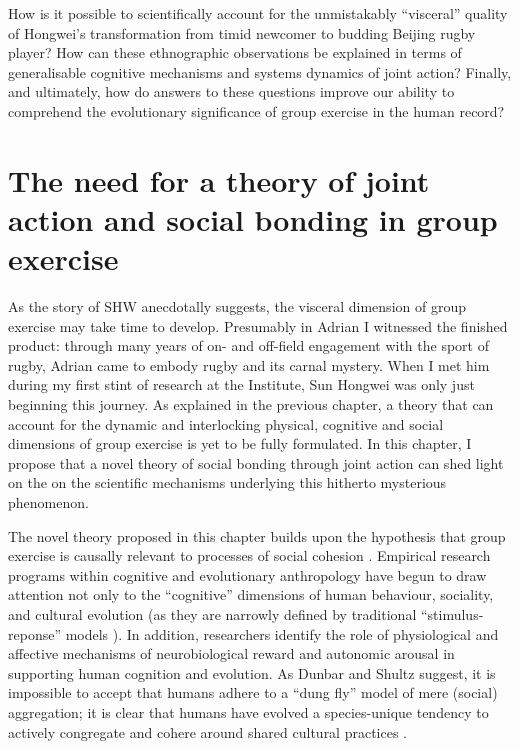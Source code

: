 \begin{CJK}{UTF8}{gbsn}
How is it possible to scientifically account for the unmistakably ``visceral'' quality of Hongwei's transformation from timid newcomer to budding Beijing rugby player?  How can these ethnographic observations be explained in terms of generalisable cognitive mechanisms and systems dynamics of joint action?  Finally, and ultimately, how do answers to these questions improve our ability to comprehend the evolutionary significance of group exercise in the human record?



\section{The need for a theory of joint action and social bonding in group exercise}
As the story of SHW anecdotally suggests, the visceral dimension of group exercise may take time to develop.  Presumably in  Adrian I witnessed the finished product: through many years of on- and off-field engagement with the sport of rugby, Adrian came to embody rugby and its carnal mystery.  When I met him during my first stint of research at the Institute, Sun Hongwei was only just beginning this journey. As explained in the previous chapter, a theory that can account for the dynamic and interlocking physical, cognitive and social dimensions of group exercise is yet to be fully formulated.  In this chapter, I propose that a novel theory of social bonding through joint action can shed light on the on the scientific mechanisms underlying this hitherto mysterious phenomenon.

The novel theory proposed in this chapter builds upon the hypothesis that group exercise is causally relevant to processes of social cohesion \citep{Dunbar2010,Whitehouse2014,Cohen2017}.  Empirical research programs within cognitive and evolutionary anthropology have begun to draw attention not only to the “cognitive” dimensions of human behaviour, sociality, and cultural evolution (as they are narrowly defined by traditional “stimulus-reponse” models \citep[][]{Marr1985}).  In addition, researchers identify the role of physiological and affective mechanisms of neurobiological reward and autonomic arousal in supporting human cognition and evolution.  As Dunbar and Shultz suggest, it is impossible to accept that humans adhere to a ``dung fly'' model of mere (social) aggregation; it is clear that humans have evolved a species-unique tendency to actively congregate and cohere around shared cultural practices \citep[cf.][]{Tomasello2005}.


\end{CJK}
